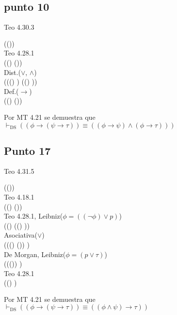 \documentclass{article}
\begin{document}
\subsection{punto 10}
\begin{logicenv}{Teo 4.30.3}
    \begin{derivation}
            (\phi \to (\psi \land \tau))\\
        Teo 4.28.1\\
            ((\neg \phi) \lor (\psi \land \tau))\\
        Dist.($\lor$, $\land$)\\
            (((\neg \phi) \lor \psi) \land ((\neg \phi) \lor \tau))\\
        Def.($\to$)\\
            ((\phi \to \psi) \land (\phi \to \tau))
    \end{derivation}
    Por MT 4.21 se demuestra que\\
    $\vdash_{\text{DS}} ((\phi \to (\psi \to \tau)) \equiv ((\phi \to \psi) \land (\phi \to \tau)))$
\end{logicenv}

\subsection{Punto 17}
\begin{logicenv}{Teo 4.31.5}
    \begin{derivation}
            (\phi \to (\psi \to \tau))\\
        Teo 4.18.1\\
            ((\neg \phi) \lor (\psi \to \tau))\\
        Teo 4.28.1, Leibniz($\phi = ((\neg \phi) \lor p)$)\\
            ((\neg \phi) \lor ((\neg \psi) \lor \tau))\\
        Asociativa($\lor$)\\
            (((\neg \phi) \lor (\neg \psi)) \lor \tau)\\
        De Morgan, Leibniz($\phi = (p \lor \tau)$)\\
            ((\neg (\phi \land \psi)) \lor \tau)\\
        Teo 4.28.1\\
            ((\phi \land \psi) \to \tau)
    \end{derivation}
    Por MT 4.21 se demuestra que\\
    $\vdash_{\text{DS}} ((\phi \to (\psi \to \tau)) \equiv ((\phi \land \psi) \to \tau))$
\end{logicenv}
\end{document}
